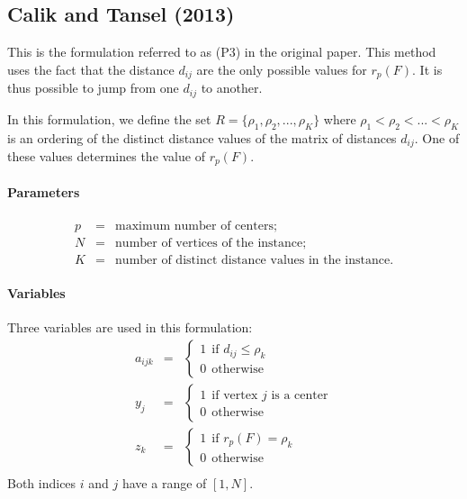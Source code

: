 \documentclass[a4paper,10pt]{article}
\begin{document}
    \subsection{Calik and Tansel (2013)}
	This is the formulation referred to as (P3) in the original paper. This method uses the fact that the distance $d_{ij}$ are the only possible values for $r_p(F)$. It is thus possible to jump from one $d_{ij}$ to another.
	
	In this formulation, we define the set $ R = \{ \rho_1, \rho_2, ..., \rho_K \}$ where $\rho_1 < \rho_2 < ... < \rho_K$ is an ordering of the distinct distance values of the matrix of distances $d_{ij}$. One of these values determines the value of $r_p(F)$.
	
	\paragraph{Parameters} 
	\begin{eqnarray*}
		p &=& \text{maximum number of centers;} \\
		N &=& \text{number of vertices of the instance;} \\
		K &=& \text{number of distinct distance values in the instance.}
	\end{eqnarray*}
	
	\paragraph{Variables} Three variables are used in this formulation:
	\begin{eqnarray*}
		a_{ijk} &=& \begin{cases}
 				1 ~~\text{if $d_{ij} \leq \rho_k$} \\
 				0 ~~\text{otherwise}
 			\end{cases} \\
		y_j &=& \begin{cases}
 				1 ~~\text{if vertex $j$ is a center} \\
 				0 ~~\text{otherwise}
 			\end{cases} \\
 		z_{k} &=& \begin{cases}
 				1 ~~\text{if $r_p(F) = \rho_k$} \\
 				0 ~~\text{otherwise}
 			\end{cases} \\
	\end{eqnarray*}
	Both indices $i$ and $j$ have a range of $[1, N]$.
	
\end{document}
